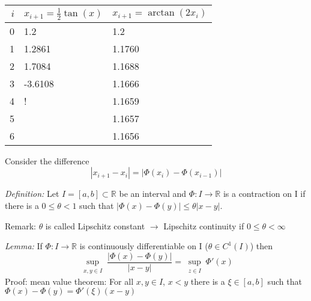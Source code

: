 \begin{center}
    \begin{tabular}{r l l }
        \toprule
        $i$ & $x_{i+1}=\frac{1}{2}\tan(x)$ & $x_{i+1}=\arctan(2x_i)$ \\
        \midrule
        0   & 1.2                          & 1.2                     \\
        1   & 1.2861                       & 1.1760                  \\
        2   & 1.7084                       & 1.1688                  \\
        3   & -3.6108                      & 1.1666                  \\
        4   & {}!                          & 1.1659                  \\
        5   &                              & 1.1657                  \\
        6   &                              & 1.1656                  \\
        \bottomrule
    \end{tabular}
\end{center}
Consider the difference
\begin{equation*}
    |x_{i+1}-x_i| = |\Phi(x_i)-\Phi(x_{i-1})|
\end{equation*}

\emph{Definition:} Let $I=[a,b] \subset \mathbb{R}$ be an interval and $\Phi: I \to \mathbb{R}$ is a contraction on I if there is a $0 \leq \theta < 1$
such that $|\Phi(x)-\Phi(y)| \leq \theta |x-y|$.

Remark: $\theta$ is called Lipschitz constant $\to$ Lipschitz continuity if $0 \leq \theta < \infty$

\vspace{10mm}

\emph{Lemma:} If $\Phi: I \to  \mathbb{R}$ is continuously differentiable on I ($\theta \in C^1(I)$) then
\begin{equation*}
    \sup_{\substack{x,y \in I}} \frac{|\Phi(x)-\Phi(y)|}{|x-y|} = \sup_{\substack{z \in I}} \Phi'(x)
\end{equation*}
Proof: mean value theorem: For all $x,y \in I$, $x<y$ there is a $\xi \in [a,b]$ such that\\
$\Phi(x)-\Phi(y) = \Phi'(\xi)(x-y)$

\vspace{10mm}

